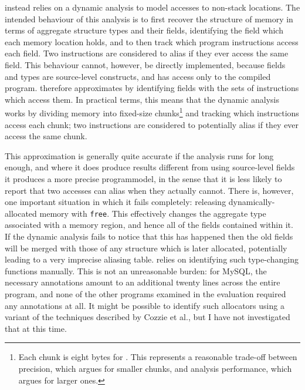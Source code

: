 {\Technique} instead relies on a dynamic analysis to model accesses to
non-stack locations.  The intended behaviour of this analysis is to
first recover the structure of memory in terms of aggregate structure
types and their fields, identifying the field which each memory
location holds, and to then track which program instructions access
each field.  Two instructions are considered to alias if they ever
access the same field.  This behaviour cannot, however, be directly
implemented, because fields and types are source-level constructs, and
{\technique} has access only to the compiled program.  {\Technique}
therefore approximates by identifying fields with the sets of
instructions which access them.  In practical terms, this means that
the dynamic analysis works by dividing memory into fixed-size
chunks\footnote{Each chunk is eight bytes for {\implementation}.  This
  represents a reasonable trade-off between precision, which argues
  for smaller chunks, and analysis performance, which argues for
  larger ones.} and tracking which instructions access each chunk; two
instructions are considered to potentially alias if they ever access
the same chunk.

This approximation is generally quite accurate if the analysis runs
for long enough, and where it does produce results different from
using source-level fields it produces a more precise
\gls{programmodel}, in the sense that it is less likely to report that
two accesses can alias when they actually cannot.  There is, however, one
important situation in which it fails completely: releasing
dynamically-allocated memory with \texttt{free}.  This effectively
changes the aggregate type associated with a memory region, and hence
all of the fields contained within it.  If the dynamic analysis fails
to notice that this has happened then the old fields will be merged
with those of any structure which is later allocated, potentially
leading to a very imprecise aliasing table.  {\Technique} relies on
identifying such type-changing functions manually.  This is not an
unreasonable burden: for MySQL, the necessary annotations amount to an
additional twenty lines across the entire program, and none of the
other programs examined in the evaluation required any annotations at
all.  It might be possible to identify such allocators using a variant
of the techniques described by Cozzie et al.\cite{Cozzie2008}, but I
have not investigated that at this time.


